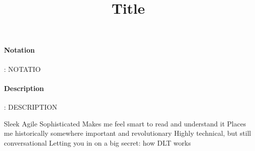 \documentclass[9pt,a4paper,oneside]{scrartcl}
\author{}
\title{Title}
\date{}
\begin{document}
\maketitle
\paragraph{Notation}: NOTATIO
\paragraph{Description}: DESCRIPTION

Sleek 
Agile
Sophisticated
Makes me feel smart to read and understand it
Places me historically somewhere important and revolutionary
Highly technical, but still conversational
Letting you in on a big secret: how DLT works

\printbibliography
\end{document}
